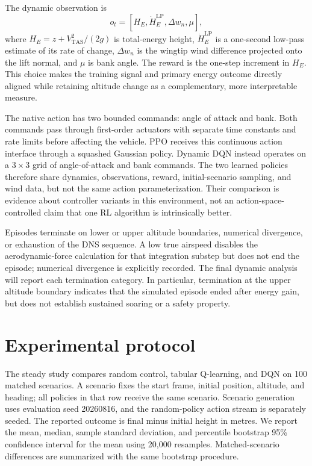 \documentclass{article}
\begin{document}
The dynamic observation is
\begin{equation}
  o_t=[H_E,\dot H_E^{\mathrm{LP}},\Delta w_n,\mu],
\end{equation}
where $H_E=z+V_{\mathrm{TAS}}^2/(2g)$ is total-energy height,
$\dot H_E^{\mathrm{LP}}$ is a one-second low-pass estimate of its rate of
change, $\Delta w_n$ is the wingtip wind difference projected onto the lift
normal, and $\mu$ is bank angle.  The reward is the one-step increment in
$H_E$.  This choice makes the training signal and primary energy outcome
directly aligned while retaining altitude change as a complementary, more
interpretable measure.

The native action has two bounded commands: angle of attack and bank.  Both
commands pass through first-order actuators with separate time constants and
rate limits before affecting the vehicle.  PPO receives this continuous action
interface through a squashed Gaussian policy.  Dynamic DQN instead operates on
a $3\times3$ grid of angle-of-attack and bank commands.  The two learned
policies therefore share dynamics, observations, reward, initial-scenario
sampling, and wind data, but not the same action parameterization.  Their
comparison is evidence about controller variants in this environment, not an
action-space-controlled claim that one RL algorithm is intrinsically better.

Episodes terminate on lower or upper altitude boundaries, numerical divergence,
or exhaustion of the DNS sequence.  A low true airspeed disables the
aerodynamic-force calculation for that integration substep but does not end the
episode; numerical divergence is explicitly recorded.  The final dynamic
analysis will report each termination category.  In particular, termination at
the upper altitude boundary indicates that the simulated episode ended after
energy gain, but does not establish sustained soaring or a safety property.

\section{Experimental protocol}
\label{sec:protocol}

The steady study compares random control, tabular Q-learning, and DQN on 100
matched scenarios.  A scenario fixes the start frame, initial position,
altitude, and heading; all policies in that row receive the same scenario.
Scenario generation uses evaluation seed 20260816, and the random-policy action
stream is separately seeded.  The reported outcome is final minus initial
height in metres.  We report the mean, median, sample standard deviation, and
percentile bootstrap 95\% confidence interval for the mean using 20,000
resamples.  Matched-scenario differences are summarized with the same bootstrap
procedure.
\end{document}
